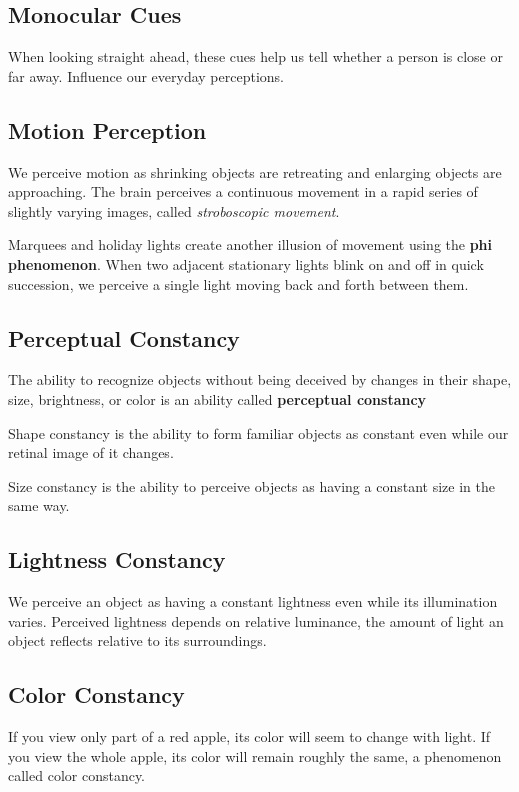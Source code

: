 \documentclass[12pt]{article}
\begin{document}
\subsection*{Monocular Cues}
When looking straight ahead, these cues help us tell whether a person is close or far away. Influence our everyday perceptions.

\subsection*{Motion Perception}
We perceive motion as shrinking objects are retreating and enlarging objects are approaching. The brain perceives a continuous movement in a rapid series of slightly varying images, called \textit{stroboscopic movement}.

Marquees and holiday lights create another illusion of movement using the \textbf{phi phenomenon}. When two adjacent stationary lights blink on and off in quick succession, we perceive a single light moving back and forth between them.

\subsection*{Perceptual Constancy}
The ability to recognize objects without being deceived by changes in their shape, size, brightness, or color is an ability called \textbf{perceptual constancy}

Shape constancy is the ability to form familiar objects as constant even while our retinal image of it changes.

Size constancy is the ability to perceive objects as having a constant size in the same way. 

\subsection*{Lightness Constancy}
We perceive an object as having a constant lightness even while its illumination varies. Perceived lightness depends on relative luminance, the amount of light an object reflects relative to its surroundings. 

\subsection*{Color Constancy}
If you view only part of a red apple, its color will seem to change with light. If you view the whole apple, its color will remain roughly the same, a phenomenon called color constancy.
\end{document}
